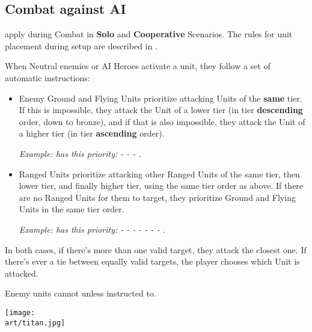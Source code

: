 \begin{multicols}{2}
\subsection*{Combat against AI}

 apply during Combat in \textbf{Solo} and \textbf{Cooperative} Scenarios.
The rules for unit placement during setup are described in .

When Neutral enemies or AI Heroes activate a unit, they follow a set of automatic instructions:\par

\begin{itemize}
  \item Enemy Ground  and Flying  Units prioritize attacking Units of the \textbf{same} tier.
  If this is impossible, they attack the Unit of a lower tier (in tier \textbf{descending} order, down to bronze), and if that is also impossible, they attack the Unit of a higher tier (in tier \textbf{ascending} order).\par

  \textit{Example:  has this priority:
  - 
  - 
  - .}

  \item Ranged  Units prioritize attacking other Ranged  Units of the same tier, then lower tier, and finally higher tier, using the same tier order as above.
  If there are no Ranged  Units for them to target, they prioritize Ground  and Flying  Units in the same tier order.\par

  \textit{Example:  has this priority:
  - 
  - 
  - 
  - 
  - 
  - 
  - .}
\end{itemize}

In both cases, if there's more than one valid target, they attack the closest one.
If there's ever a tie between equally valid targets, the player chooses which Unit is attacked.\par

Enemy units cannot  unless instructed to.

\vfill

\begin{center}
    \texttt{[image: \\art/titan.jpg]}
\end{center}

\end{multicols}
